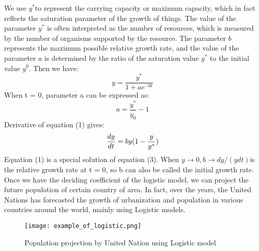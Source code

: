 \documentclass[12pt]{article}  %
\begin{document}
We use ${y^*}$to represent the carrying capacity or maximum capacity, which in fact reflects the saturation parameter of the growth of things. The value of the parameter ${y^*}$ is often interpreted as the number of resources, which is measured by the number of organisms supported by the resource. The parameter ${b}$ represents the maximum possible relative growth rate, and the value of the parameter ${a}$ is determined by the ratio of the saturation value ${y^*}$ to the initial value ${y^0}$.
Then we have:
\begin{equation}\label{logistic_original}
	{y = \frac{{{y^*}}}{{1 + a{e^{ - bt}}}}}
\end{equation}
When t = 0, parameter a can be expressed as:
\begin{equation}\label{expression_Of_a}
{a = \frac{{{y^*}}}{{{y_0}}} - 1}
\end{equation}
Derivative of equation (1) gives:
\begin{equation}\label{derivative}
	{\frac{{dy}}{{dt}} = by(1 - \frac{y}{{{y^{\rm{*}}}}})}
\end{equation}
Equation (1) is a special solution of equation (3). When ${y\rightarrow 0,b\rightarrow dy/(ydt)}$is the relative growth rate at t = 0, so b can also be called the initial growth rate.
Once we have the deciding coefficient of the logistic model, we can project the future population of certain country of area. In fact, over the years, the United Nations has forecasted the growth of urbanization and population in various countries around the world, mainly using Logistic models.
\begin{figure}[H]
	\centering
	\texttt{[image: example\_of\_logistic.png]}
	\caption{Population projection by United Nation using Logistic model}\label{fig:logst_eg}
\end{figure}
\end{document}
